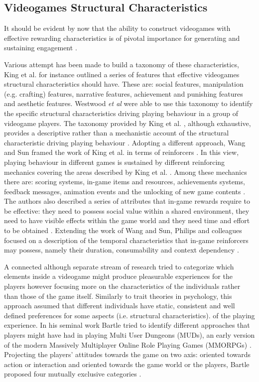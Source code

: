 \subsection{Videogames Structural Characteristics}
\label{video_structural_char}
It should be evident by now that the ability to construct videogames with effective rewarding characteristics is of pivotal importance for generating and sustaining engagement \cite{king2010role, king2010video, yannakakis2013player}. 

Various attempt has been made to build a taxonomy of these characteristics, King et al. \cite{king2010video} for instance outlined a series of features that effective videogames structural characteristics should have. These are: social features, manipulation (e.g. crafting) features, narrative features, achievement and punishing features and aesthetic features. Westwood \textit{et al} \cite{westwood2010role} were able to use this taxonomy to  identify the specific structural characteristics driving playing behaviour in a group of videogame players. The taxonomy provided by King et al. \cite{king2010video}, although exhaustive, provides a descriptive rather than a mechanistic account of the structural characteristic driving playing behaviour \cite{king2010role}. Adopting a different approach, Wang and Sun framed the work of King et al. in terms of reinforcers \cite{king2010video, wang2011game}. In this view, playing behaviour in different games is sustained by different reinforcing mechanics covering the areas described by King et al. \cite{king2010video, wang2011game}. Among these mechanics there are: scoring systems, in-game items and resources, achievements systems, feedback messages, animation events and the unlocking of new game contents \cite{wang2011game}. The authors also described a series of attributes that in-game rewards require to be effective: they need to possess social value within a shared environment, they need to have visible effects within the game world and they need time and effort to be obtained \cite{wang2011game}. Extending the work of Wang and Sun, Philips and colleagues focused on a description of the temporal characteristics that in-game reinforcers may possess, namely their duration, consumability and context dependency \cite{phillips2013videogame}. 

A connected although separate stream of research tried to categorize which elements inside a videogame might produce pleasurable experiences for the players however focusing more on the characteristics of the individuals rather than those of the game itself. Similarly to trait theories in psychology, this approach assumed that different individuals have static, consistent and well defined preferences for some aspects (i.e. structural characteristics). of the playing experience. In his seminal work Bartle tried to identify different approaches that players might have had in playing Multi User Dungeons (MUDs), an early version of the modern Massively Multiplayer Online Role Playing Games (MMORPGs) \cite{bartle1996hearts}. Projecting the players’ attitudes towards the game on two axis: oriented towards action or interaction and oriented towards the game world or the players, Bartle proposed four mutually exclusive categories \cite{bartle1996hearts}.


